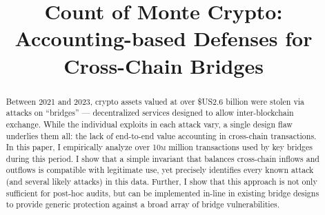 \documentclass[conference,compsoc]{IEEEtran}
\newcommand{\mil}{\textsc{m}\xspace}
\begin{document}
\title{Count of Monte Crypto: Accounting-based Defenses for Cross-Chain Bridges} %





\iffalse
\newcommand{\alex}[1]{\textcolor{red}{\noindent[AL: #1]}}
\newcommand{\elisa}[1]{\textcolor{blue}{\noindent[EL: #1]}}
\newcommand{\geoff}[1]{\textcolor{teal}{[GV: #1]}}
\newcommand{\deian}[1]{\textcolor{green}{[ds: #1]}}
\else
\newcommand{\alex}[1]{}
\newcommand{\elisa}[1]{}
\newcommand{\geoff}[1]{}
\newcommand{\deian}[1]{}
\fi

\maketitle

\begin{abstract}
Between 2021 and 2023, crypto assets valued at over \$US2.6 billion
were stolen via attacks on ``bridges'' --- decentralized services
designed to allow inter-blockchain exchange.  While the individual
exploits in each attack vary, a single design flaw underlies them all:
the lack of end-to-end value accounting in cross-chain transactions.
In this paper, I empirically analyze over 10\mil million transactions used
by key bridges during this period.  I show that a simple invariant
that balances cross-chain inflows and outflows is compatible with
legitimate use, yet precisely identifies every known attack (and
several likely attacks) in this data.  Further, I show that this
approach is not only sufficient for post-hoc audits, but can be
implemented in-line in existing bridge designs to provide generic
protection against a broad array of bridge vulnerabilities.
\end{abstract}



% 



%














%





% 

% 

% 

% 
% 



% 


\newpage


\clearpage

\end{document}
